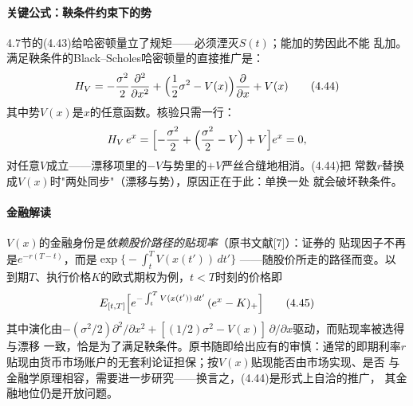 \paragraph{关键公式：鞅条件约束下的势}
4.7节的(4.43)给哈密顿量立了规矩——必须湮灭$S(t)$；能加的势因此不能
乱加。满足鞅条件的Black--Scholes哈密顿量的直接推广是：
\begin{equation*}
H_{V}=-\frac{\sigma^{2}}{2}\frac{\partial^{2}}{\partial x^{2}}
+\Bigl(\frac{1}{2}\sigma^{2}-V(x)\Bigr)\frac{\partial}{\partial x}
+V(x)
\tag{4.44}
\end{equation*}
其中势$V(x)$是$x$的任意函数。核验只需一行：
\begin{equation*}
H_{V}\,e^{x}
=\Bigl[-\frac{\sigma^{2}}{2}+\Bigl(\frac{\sigma^{2}}{2}-V\Bigr)+V\Bigr]
e^{x}=0,
\end{equation*}
对任意$V$成立——漂移项里的$-V$与势里的$+V$严丝合缝地相消。(4.44)把
常数$r$替换成$V(x)$时"两处同步"（漂移与势），原因正在于此：单换一处
就会破坏鞅条件。

\paragraph{金融解读}
$V(x)$的金融身份是\emph{依赖股价路径的贴现率}（原书文献[7]）：证券的
贴现因子不再是$e^{-r(T-t)}$，而是$\exp\bigl\{-\int_{t}^{T}V(x(t'))\,dt'\bigr\}$
——随股价所走的路径而变。以
到期$T$、执行价格$K$的欧式期权为例，$t<T$时刻的价格即
\begin{equation*}
E_{[t,T]}\Bigl[e^{-\int_{t}^{T}V(x(t'))\,dt'}\,(e^{x}-K)_{+}\Bigr]
\tag{4.45}
\end{equation*}
其中演化由$-(\sigma^{2}/2)\partial^{2}/\partial x^{2}
+[(1/2)\sigma^{2}-V(x)]\,\partial/\partial x$驱动，而贴现率被选得与漂移
一致，恰是为了满足鞅条件。原书随即给出应有的审慎：通常的即期利率$r$
贴现由货币市场账户的无套利论证担保；按$V(x)$贴现能否由市场实现、是否
与金融学原理相容，需要进一步研究——换言之，(4.44)是形式上自洽的推广，
其金融地位仍是开放问题。

